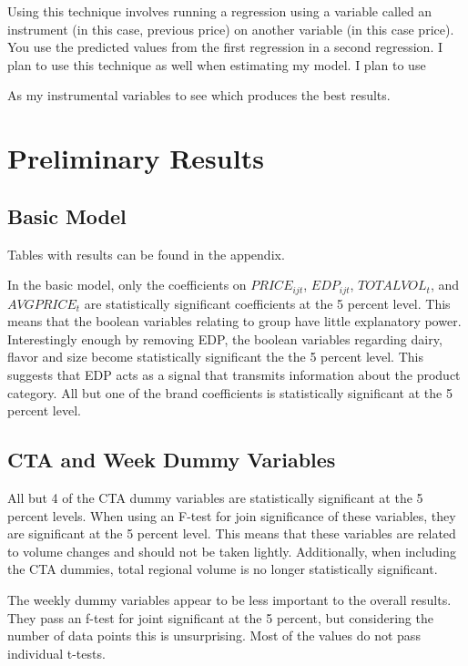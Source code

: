\documentclass{article}
\begin{document}
Using this technique involves running a regression using a variable called an instrument (in this case, previous price) on another variable (in this case price). You use the predicted values from the first regression in a second regression.  I plan to use this technique as well when estimating my model. I plan to use 


As my instrumental variables to see which produces the best results.

\section{Preliminary Results}

\subsection{Basic Model}

Tables with results can be found in the appendix.

In the basic model, only the coefficients on ${PRICE}_{ijt}$, ${EDP}_{ijt}$, ${TOTALVOL}_t $, and ${AVGPRICE}_{t}$ are statistically significant coefficients at the 5 percent level. This means that the boolean variables relating to group have little explanatory power. Interestingly enough by removing EDP, the boolean variables regarding dairy, flavor and size become statistically significant the the 5 percent level. This suggests that EDP acts as a signal that transmits information about the product category. All but one of the brand coefficients is statistically significant at the 5 percent level.


\subsection{CTA and Week Dummy Variables}

All but 4 of the CTA dummy variables are statistically significant at the 5 percent levels. When using an F-test for join significance of these variables, they are significant at the 5 percent level. This means that these variables are related to volume changes and should not be taken lightly. Additionally, when including the CTA dummies, total regional volume is no longer statistically significant. 

The weekly dummy variables appear to be less important to the overall results. They pass an f-test for joint significant at the 5 percent, but considering the number of data points this is unsurprising. Most of the values do not pass individual t-tests.
\end{document}
